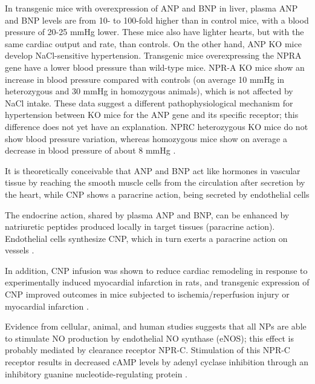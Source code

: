 \documentclass[14pt,a4paper,onecolumn]{extarticle}
\begin{document}
In transgenic mice with overexpression of ANP and BNP in liver, plasma ANP and BNP levels are from 10- to 100-fold higher than in control mice, with a blood pressure of 20-25 mmHg lower. These mice also have lighter hearts, but with the same cardiac output and rate, than controls.  On the other hand, ANP KO mice develop NaCl-sensitive hypertension. Transgenic mice overexpressing the NPRA gene have  a lower blood pressure than wild-type mice. NPR-A KO mice show an increase in blood pressure compared with controls (on average 10 mmHg in heterozygous and 30 mmHg in homozygous animals), which is not affected by NaCl intake. These data suggest a different pathophysiological mechanism for hypertension between KO mice for the ANP gene and its specific receptor; this difference does not yet have an explanation. NPRC heterozygous KO mice do not show blood pressure variation, whereas homozygous mice show on average a decrease in blood pressure of about 8 mmHg \citep{251}.


It is theoretically conceivable that ANP and BNP act like hormones in vascular tissue by reaching the smooth muscle cells from the circulation after secretion by the heart, while CNP shows a paracrine action, being secreted by endothelial cells \citep{57}%

The endocrine action, shared by plasma ANP and BNP, can be enhanced by natriuretic peptides produced locally in target tissues (paracrine action). Endothelial cells synthesize CNP, which in turn exerts a paracrine action on vessels \citep{88}.

In addition, CNP infusion was shown to reduce cardiac remodeling in response to experimentally induced myocardial infarction in rats, and transgenic expression of CNP improved outcomes in mice subjected to ischemia/reperfusion injury or myocardial infarction \citep{Wang2007}. %

Evidence from cellular, animal, and human studies suggests that all NPs are able to stimulate NO production by endothelial NO synthase (eNOS); this effect is probably mediated by clearance receptor NPR-C. Stimulation of this NPR-C receptor results in decreased cAMP levels by adenyl cyclase inhibition through an inhibitory guanine nucleotide-regulating protein \citep{270}.
\end{document}

